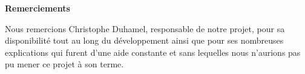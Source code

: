 \null
\vspace{4cm}
\begin{flushright}
	{\Large \bfseries Remerciements}

	\vspace{1cm}

	\begin{minipage}{0.62\textwidth}
		Nous remercions Christophe Duhamel, responsable de notre projet, pour sa disponibilité tout au long du développement ainsi que pour ses nombreuses explications qui furent d'une aide constante et sans lequelles nous n'aurions pas pu mener ce projet à son terme.
	\end{minipage}

\end{flushright}
